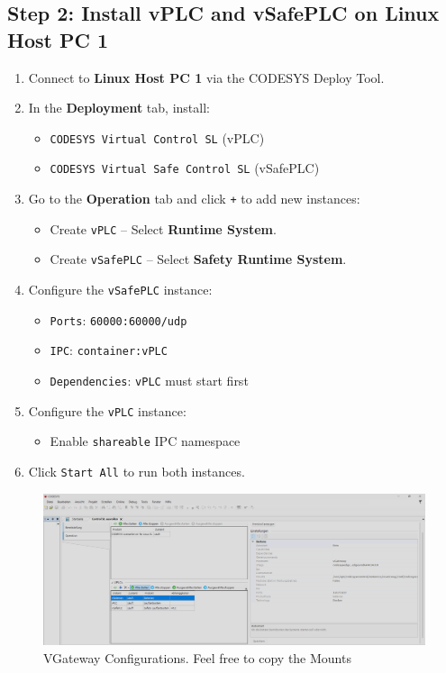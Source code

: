 \documentclass[a4paper,12pt]{article}
\begin{document}
\subsection*{Step 2: Install vPLC and vSafePLC on Linux Host PC 1}

\begin{enumerate}
	\item Connect to \textbf{Linux Host PC 1} via the CODESYS Deploy Tool.
	\item In the \textbf{Deployment} tab, install:
	\begin{itemize}
		\item \texttt{CODESYS Virtual Control SL} (vPLC)
		\item \texttt{CODESYS Virtual Safe Control SL} (vSafePLC)
	\end{itemize}
	\item Go to the \textbf{Operation} tab and click \texttt{+} to add new instances:
	\begin{itemize}
		\item Create \texttt{vPLC} – Select \textbf{Runtime System}.
		\item Create \texttt{vSafePLC} – Select \textbf{Safety Runtime System}.
	\end{itemize}
	\item Configure the \texttt{vSafePLC} instance:
	\begin{itemize}
		\item \texttt{Ports}: \texttt{60000:60000/udp}
		\item \texttt{IPC}: \texttt{container:vPLC}
		\item \texttt{Dependencies}: \texttt{vPLC} must start first
	\end{itemize}
	\item Configure the \texttt{vPLC} instance:
	\begin{itemize}
		\item Enable \texttt{shareable} IPC namespace
	\end{itemize}
	\item Click \texttt{Start All} to run both instances.
\end{enumerate}

\begin{figure}[H]
	\centering
	\includegraphics[width=1\textwidth]{6.PNG}
	\caption{VGateway Configurations. Feel free to copy the Mounts}
\end{figure}
\end{document}
